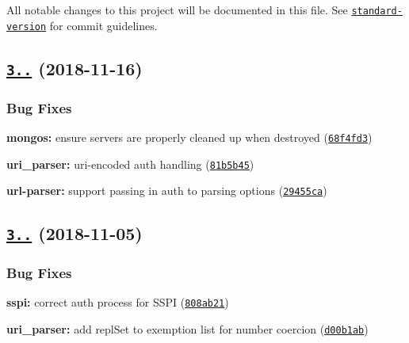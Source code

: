All notable changes to this project will be documented in this file. See \href{https://github.com/conventional-changelog/standard-version}{\tt standard-\/version} for commit guidelines.

\label{_3.1.9}%
 \subsection*{\href{https://github.com/mongodb-js/mongodb-core/compare/v3.1.8...v3.1.9}{\tt 3..} (2018-\/11-\/16)}

\subsubsection*{Bug Fixes}


\begin{DoxyItemize}
\item {\bfseries mongos\+:} ensure servers are properly cleaned up when destroyed (\href{https://github.com/mongodb-js/mongodb-core/commit/68f4fd3}{\tt 68f4fd3})
\item {\bfseries uri\+\_\+parser\+:} uri-\/encoded auth handling (\href{https://github.com/mongodb-js/mongodb-core/commit/81b5b45}{\tt 81b5b45})
\item {\bfseries url-\/parser\+:} support passing in {\ttfamily auth} to parsing options (\href{https://github.com/mongodb-js/mongodb-core/commit/29455ca}{\tt 29455ca})
\end{DoxyItemize}

\label{_3.1.8}%
 \subsection*{\href{https://github.com/mongodb-js/mongodb-core/compare/v3.1.7...v3.1.8}{\tt 3..} (2018-\/11-\/05)}

\subsubsection*{Bug Fixes}


\begin{DoxyItemize}
\item {\bfseries sspi\+:} correct auth process for S\+S\+PI (\href{https://github.com/mongodb-js/mongodb-core/commit/808ab21}{\tt 808ab21})
\item {\bfseries uri\+\_\+parser\+:} add {\ttfamily repl\+Set} to exemption list for number coercion (\href{https://github.com/mongodb-js/mongodb-core/commit/d00b1ab}{\tt d00b1ab})
\end{DoxyItemize}

